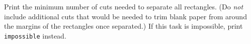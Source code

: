 
Print the minimum number of cuts needed to separate all rectangles. (Do \emph{not} include additional cuts that would be needed to trim blank paper from around the margins of the rectangles once separated.) If this task is impossible, print \texttt{impossible} instead.

